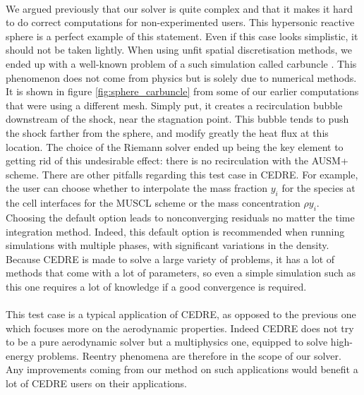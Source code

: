         \paragraph{}
        We argued previously that our solver is quite complex and that it makes it hard to do correct computations for non-experimented users.
        This hypersonic reactive sphere is a perfect example of this statement.
        Even if this case looks simplistic, it should not be taken lightly.
        When using unfit spatial discretisation methods, we ended up with a well-known problem of a such simulation called carbuncle \cite{MacCormack2013}.
        This phenomenon does not come from physics but is solely due to numerical methods.
        It is shown in figure \ref{fig:sphere_carbuncle} from some of our earlier computations that were using a different mesh.
        Simply put, it creates a recirculation bubble downstream of the shock, near the stagnation point.
        This bubble tends to push the shock farther from the sphere, and modify greatly the heat flux at this location.
        The choice of the Riemann solver ended up being the key element to getting rid of this undesirable effect: there is no recirculation with the AUSM+ scheme.
        There are other pitfalls regarding this test case in CEDRE.
        For example, the user can choose whether to interpolate the mass fraction $y_i$ for the species at the cell interfaces for the MUSCL scheme or the mass concentration $\rho y_i$.
        Choosing the default option leads to nonconverging residuals no matter the time integration method.
        Indeed, this default option is recommended when running simulations with multiple phases, with significant variations in the density.
        Because CEDRE is made to solve a large variety of problems, it has a lot of methods that come with a lot of parameters, so even a simple simulation such as this one requires a lot of knowledge if a good convergence is required.

        \paragraph{}
        This test case is a typical application of CEDRE, as opposed to the previous one which focuses more on the aerodynamic properties.
        Indeed CEDRE does not try to be a pure aerodynamic solver but a multiphysics one, equipped to solve high-energy problems.
        Reentry phenomena are therefore in the scope of our solver.
        Any improvements coming from our method on such applications would benefit a lot of CEDRE users on their applications.


